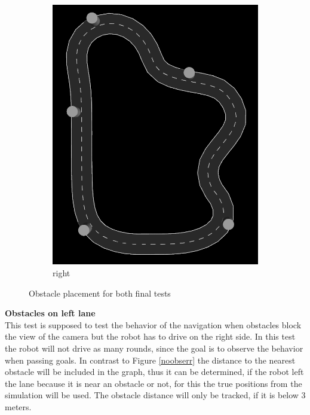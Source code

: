 \begin{figure}[H]
\begin{subfigure}{.5\linewidth}
		\includegraphics[width=\textwidth]{Pictures/right final obs}
		\caption{right}
	\end{subfigure}

	\caption{Obstacle placement for both final tests}
	\label{obstaclefinaltest}

\end{figure}
\textbf{Obstacles on left lane}\\
This test is supposed to test the behavior of the navigation when obstacles block the view of the camera but the robot has to drive on the right side. In this test the robot will not drive as many rounds, since the goal is to observe the behavior when passing goals. In contrast to Figure \ref{noobserr} the distance to the nearest obstacle will be included in the graph, thus it can be determined, if the robot left the lane because it is near an obstacle or not, for this the true positions from the simulation will be used. The obstacle distance will only be tracked, if it is below 3 meters.
